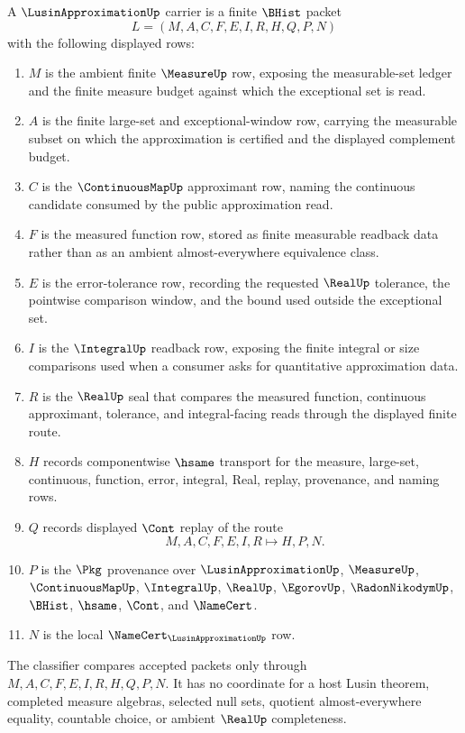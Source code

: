 \begin{definition}\label{def:lusin-approximation-carrier}
A $\LusinApproximationUp$ carrier is a finite $\BHist$ packet
$$
L=(M,A,C,F,E,I,R,H,Q,P,N)
$$
with the following displayed rows:
\begin{enumerate}
\item $M$ is the ambient finite $\MeasureUp$ row, exposing the measurable-set ledger and the finite measure budget against which the exceptional set is read.
\item $A$ is the finite large-set and exceptional-window row, carrying the measurable subset on which the approximation is certified and the displayed complement budget.
\item $C$ is the $\ContinuousMapUp$ approximant row, naming the continuous candidate consumed by the public approximation read.
\item $F$ is the measured function row, stored as finite measurable readback data rather than as an ambient almost-everywhere equivalence class.
\item $E$ is the error-tolerance row, recording the requested $\RealUp$ tolerance, the pointwise comparison window, and the bound used outside the exceptional set.
\item $I$ is the $\IntegralUp$ readback row, exposing the finite integral or size comparisons used when a consumer asks for quantitative approximation data.
\item $R$ is the $\RealUp$ seal that compares the measured function, continuous approximant, tolerance, and integral-facing reads through the displayed finite route.
\item $H$ records componentwise $\hsame$ transport for the measure, large-set, continuous, function, error, integral, Real, replay, provenance, and naming rows.
\item $Q$ records displayed $\Cont$ replay of the route
$$
M,A,C,F,E,I,R \longmapsto H,P,N .
$$
\item $P$ is the $\Pkg$ provenance over $\LusinApproximationUp$, $\MeasureUp$, $\ContinuousMapUp$, $\IntegralUp$, $\RealUp$, $\EgorovUp$, $\RadonNikodymUp$, $\BHist$, $\hsame$, $\Cont$, and $\NameCert$.
\item $N$ is the local $\NameCert_{\LusinApproximationUp}$ row.
\end{enumerate}
The classifier compares accepted packets only through $M,A,C,F,E,I,R,H,Q,P,N$. It has no coordinate for a host Lusin theorem, completed measure algebras, selected null sets, quotient almost-everywhere equality, countable choice, or ambient $\RealUp$ completeness.
\end{definition}

